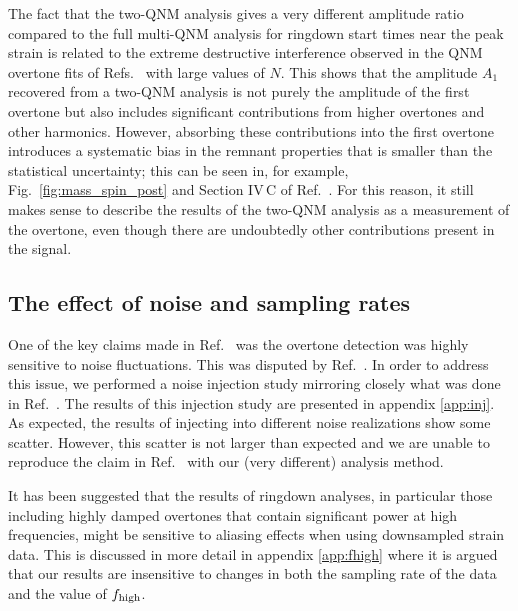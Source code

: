The fact that the two-QNM analysis gives a very different amplitude ratio compared to the full multi-QNM analysis for ringdown start times near the peak strain is related to the extreme destructive interference observed in the QNM overtone fits of Refs.~\cite{Giesler:2019uxc, Bhagwat:2019dtm, Ota:2019bzl, Cook:2020otn, JimenezForteza:2020cve, Dhani:2020nik, Finch:2021iip, Forteza:2021wfq, Dhani:2021vac, MaganaZertuche:2021syq} with large values of $N$.
This shows that the amplitude $A_1$ recovered from a two-QNM analysis is not purely the amplitude of the first overtone but also includes significant contributions from higher overtones and other harmonics. 
However, absorbing these contributions into the first overtone introduces a systematic bias in the remnant properties that is smaller than the statistical uncertainty; this can be seen in, for example, Fig.~\ref{fig:mass_spin_post} and Section IV\,C of Ref.~\cite{Giesler:2019uxc}. 
For this reason, it still makes sense to describe the results of the two-QNM analysis as a measurement of the overtone, even though there are undoubtedly other contributions present in the signal.


\subsection{The effect of noise and sampling rates}\label{subsec:noise}

One of the key claims made in Ref.~\cite{Cotesta:2022pci} was the overtone detection was highly sensitive to noise fluctuations.
This was disputed by Ref.~\cite{Isi:2022mhy}.
In order to address this issue, we performed a noise injection study mirroring closely what was done in Ref.~\cite{Cotesta:2022pci}.
The results of this injection study are presented in appendix \ref{app:inj}.
As expected, the results of injecting into different noise realizations show some scatter.
However, this scatter is not larger than expected and we are unable to reproduce the claim in Ref.~\cite{Cotesta:2022pci} with our (very different) analysis method. 

It has been suggested \cite{WillMaxTGRtelecon} that the results of ringdown analyses, in particular those including highly damped overtones that contain significant power at high frequencies, might be sensitive to aliasing effects when using downsampled strain data.
This is discussed in more detail in appendix \ref{app:fhigh} where it is argued that our results are insensitive to changes in both the sampling rate of the data and the value of $f_{\rm high}$.


